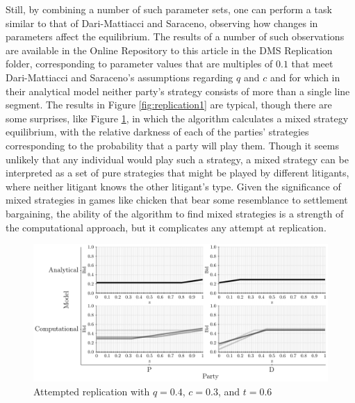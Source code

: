 \documentclass{article}
\begin{document}
Still, by combining a number of such parameter sets, one can perform a task similar to that of Dari-Mattiacci and Saraceno, observing how changes in parameters affect the equilibrium. The results of a number of such observations are available in the Online Repository to this article in the DMS Replication folder, corresponding to parameter values that are multiples of $0.1$ that meet Dari-Mattiacci and Saraceno's assumptions regarding $q$ and $c$ and for which in their analytical model neither party's strategy consists of more than a single line segment. The results in Figure \ref{fig:replication1} are typical, though there are some surprises, like Figure \ref{fig:replication2}, in which the algorithm calculates a mixed strategy equilibrium, with the relative darkness of each of the parties' strategies corresponding to the probability that a party will play them. Though it seems unlikely that any individual would play such a strategy, a mixed strategy can be interpreted as a set of pure strategies that might be played by different litigants, where neither litigant knows the other litigant's type. Given the significance of mixed strategies in games like chicken that bear some resemblance to settlement bargaining, the ability of the algorithm to find mixed strategies is a strength of the computational approach, but it complicates any attempt at replication.

\begin{figure}[h!]
\centering
\includegraphics[scale=0.52, trim={0in 0in 0in 0in}, clip]{../Figures/replication2.pdf}
\caption{Attempted replication with $q = 0.4$, $c = 0.3$, and $t = 0.6$}
\label{fig:replication2}
\end{figure}
\end{document}

